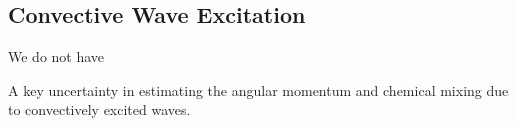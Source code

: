 {\color{purple}
\subsection{Convective Wave Excitation}
}

We do not have 

A key uncertainty in estimating the angular momentum and chemical mixing due to convectively excited waves.

